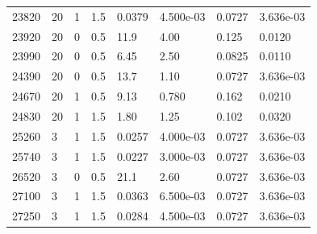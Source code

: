 \documentclass[preview]{standalone}
\begin{document}
{{{{{\begin{tabular}{L{1.2cm}C{1.2cm} C{0.3cm}C{0.5cm} C{1.4cm}C{1.4cm} C{1.4cm}C{1.4cm}}
  23820  &    20  & 1     & 1.5 &  0.0379  & 4.500e-03  & 0.0727 &  3.636e-03   \\ 
  23920  &    20  & 0     & 0.5 &  11.9  & 4.00  & 0.125 &  0.0120   \\ 
  23990  &    20  & 0     & 0.5 &  6.45  & 2.50  & 0.0825 &  0.0110   \\ 
  24390  &    20  & 0     & 0.5 &  13.7  & 1.10  & 0.0727 &  3.636e-03   \\ 
  24670  &    20  & 1     & 0.5 &  9.13  & 0.780  & 0.162 &  0.0210   \\ 
  24830  &    20  & 1     & 1.5 &  1.80  & 1.25  & 0.102 &  0.0320   \\ 
  25260  &     3  & 1     & 1.5 &  0.0257  & 4.000e-03  & 0.0727 &  3.636e-03   \\ 
  25740  &     3  & 1     & 1.5 &  0.0227  & 3.000e-03  & 0.0727 &  3.636e-03   \\ 
  26520  &     3  & 0     & 0.5 &  21.1  & 2.60  & 0.0727 &  3.636e-03   \\ 
  27100  &     3  & 1     & 1.5 &  0.0363  & 6.500e-03  & 0.0727 &  3.636e-03   \\ 
  27250  &     3  & 1     & 1.5 &  0.0284  & 4.500e-03  & 0.0727 &  3.636e-03   \\ 
\hline 
\end{tabular} 

}}}}}
\end{document}
